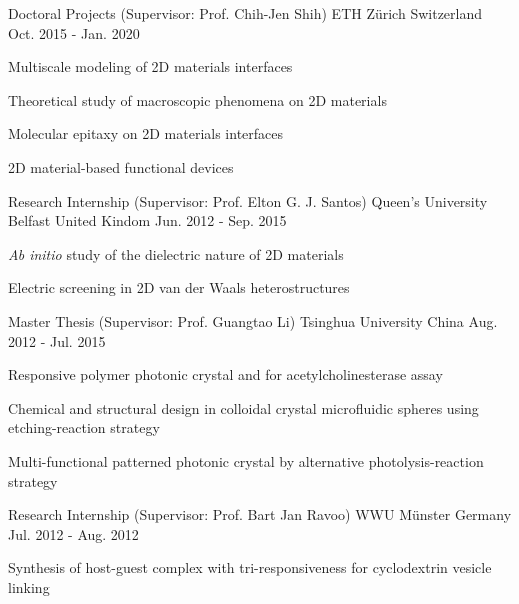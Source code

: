 

\begin{cventries}
\cventry
{Doctoral Projects (Supervisor: Prof.  Chih-Jen Shih)} %
{ETH Z\"{u}rich} %
{Switzerland} %
{Oct. 2015 - Jan. 2020} %
{
  \begin{cvitems}
  \item Multiscale modeling of 2D materials interfaces
  \item Theoretical study of macroscopic phenomena on 2D materials
  \item Molecular epitaxy on 2D materials interfaces
  \item 2D material-based functional devices
  \end{cvitems}
}

\cventry
{Research Internship (Supervisor: Prof.  Elton G. J. Santos)} %
{Queen's University Belfast} %
{United Kindom} %
{Jun. 2012 - Sep. 2015} %
{
  \begin{cvitems}
  \item \textit{Ab initio} study of the dielectric nature of 2D materials
  \item Electric screening in 2D van der Waals heterostructures
  \end{cvitems}
}

\cventry
{Master Thesis (Supervisor: Prof.  Guangtao Li)}
{Tsinghua University}
{China}
{Aug. 2012 - Jul. 2015}
{
  \begin{cvitems}
  \item Responsive polymer photonic crystal and for acetylcholinesterase assay
  \item Chemical and structural design in colloidal crystal microfluidic spheres using etching-reaction strategy
  \item Multi-functional patterned photonic crystal by alternative photolysis-reaction strategy
  \end{cvitems}
}

\cventry
{Research Internship (Supervisor: Prof. Bart Jan Ravoo)} %
{WWU M\"{u}nster} %
{Germany} %
{Jul. 2012 - Aug. 2012} %
{
  \begin{cvitems}
  \item Synthesis of host-guest complex with tri-responsiveness for
    cyclodextrin vesicle linking
  \end{cvitems}
}


\end{cventries}
